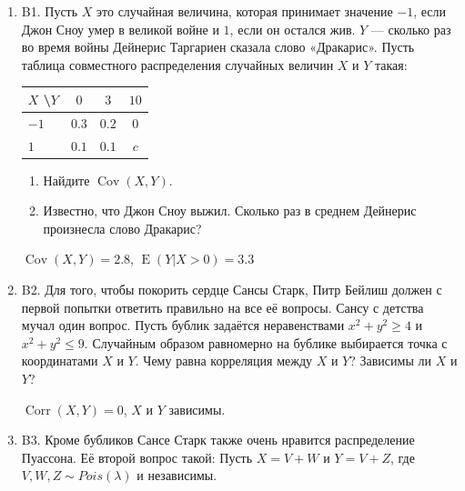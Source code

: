 \documentclass[12pt]{article}
\DeclareMathOperator{\Cov}{Cov}
\DeclareMathOperator{\Corr}{Corr}
\DeclareMathOperator{\E}{E}
\newenvironment{problem}{}{}
\newenvironment{sol}{}{} %
\begin{document}
\begin{enumerate}

\begin{problem}
\item[B1.] Пусть $X$ это случайная величина, которая принимает значение $-1$, если Джон Сноу умер в великой войне и $1$, если он остался жив. $Y$ — сколько раз во время войны Дейнерис Таргариен сказала слово «Дракарис». Пусть таблица совместного распределения случайных величин $X$ и $Y$ такая:

\begin{center}\begin{tabular}{lccc}
\toprule
 $X$ \textbackslash $Y$    & $0$  & $3$   & $10$   \\ \midrule
$-1$                 & $0.3$ & $0.2$ & $0$ \\ 
 $1$                 & $0.1$ & $0.1$ & $c$ \\ \bottomrule
\end{tabular}\end{center}

\begin{enumerate}
\item Найдите $\Cov(X,Y)$. 

\item Известно, что Джон Сноу выжил. Сколько раз в среднем Дейнерис произнесла слово Дракарис?
\end{enumerate}

\begin{sol}
$\Cov(X,Y) = 2.8$, $\E(Y|X>0) = 3.3$ 
\end{sol}
\end{problem}

\begin{problem}
\item[B2.] Для того, чтобы покорить сердце Сансы Старк, Питр Бейлиш должен с первой попытки ответить правильно на все её вопросы. Сансу с детства мучал один вопрос. Пусть бублик задаётся неравенствами $x^2+y^2 \geq 4$ и $x^2+y^2\leq9$. Случайным образом равномерно на бублике выбирается точка с координатами $X$ и $Y$. Чему равна корреляция между $X$ и $Y$? Зависимы ли $X$ и $Y$?

\begin{sol}
$\Corr(X,Y) = 0$, $X$ и $Y$ зависимы.
\end{sol}
\end{problem}

\begin{problem}
\item[B3.] Кроме бубликов Сансе Старк также очень нравится распределение Пуассона. Её второй вопрос такой:
Пусть $X = V+W$ и $Y = V+Z$, где  $V,W,Z \sim Pois(\lambda)$ и независимы.


\end{problem}
\end{enumerate}
\end{document}
